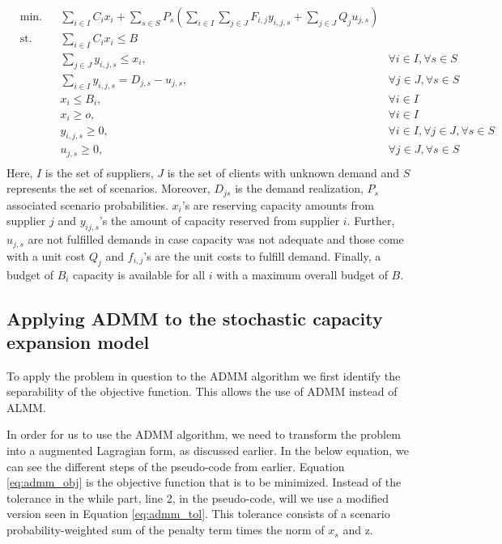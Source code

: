 \documentclass[a4paper]{artikel3}
\begin{document}
\begin{align}
    &\text{min.}& & \sum_{i \in I} C_i x_i + \sum_{s \in S} P_s(\sum_{i \in I} \sum_{j \in J} F_{i,j} y_{i,j,s}+\sum_{j \in J} Q_j u_{j,s})& \label{eq:original_obj} \\
    &\text{st.}& & \sum_{i \in I} C_i x_i \leq B & \\
    &&& \sum_{j \in J} y_{i,j,s} \leq x_i, &\forall i \in I, \forall s \in S \\
    &&& \sum_{i \in I} y_{i,j,s} = D_{j,s}-u_{j,s}, &\forall j \in J, \forall s \in S \\
    &&& x_i \leq B_i, &\forall i \in I \\
    &&& x_i \geq o, &\forall i \in I \\
    &&&  y_{i,j,s} \geq 0, &\forall i \in I, \forall j \in J, \forall s \in S \\
    &&&  u_{j,s} \geq 0, &\forall j \in J, \forall s \in S \\
\end{align}
Here, $I$ is the set of suppliers, $J$ is the set of clients with unknown demand and $S$ represents the set of scenarios. Moreover, $D_{js}$ is the demand realization, $P_s$ associated scenario probabilities. $x_i$'s are reserving capacity amounts from supplier $j$ and $y_{ij,s}$'s the amount of capacity reserved from supplier $i$. Further, $u_{j,s}$ are not fulfilled demands in case capacity was not adequate and those come with a unit cost $Q_j$ and $f_{i,j}$'s are the unit costs to fulfill demand. Finally, a budget of $B_i$ capacity is available for all $i$ with a maximum overall budget of $B$.



\subsection{Applying ADMM to the stochastic capacity expansion model}
To apply the problem in question to the ADMM algorithm we first identify the separability of the objective function. This allows the use of ADMM instead of ALMM.

In order for us to use the ADMM algorithm, we need to transform the problem into a augmented Lagragian form, as discussed earlier. %
In the below equation, we can see the different steps of the pseudo-code from earlier. Equation \ref{eq:admm_obj} is the objective function that is to be minimized. Instead of the tolerance in the while part, line 2, in the pseudo-code, will we use a modified version seen in Equation \ref{eq:admm_tol}. This tolerance consists of a scenario probability-weighted sum of the penalty term times the norm of $x_s$ and z.
\end{document}
